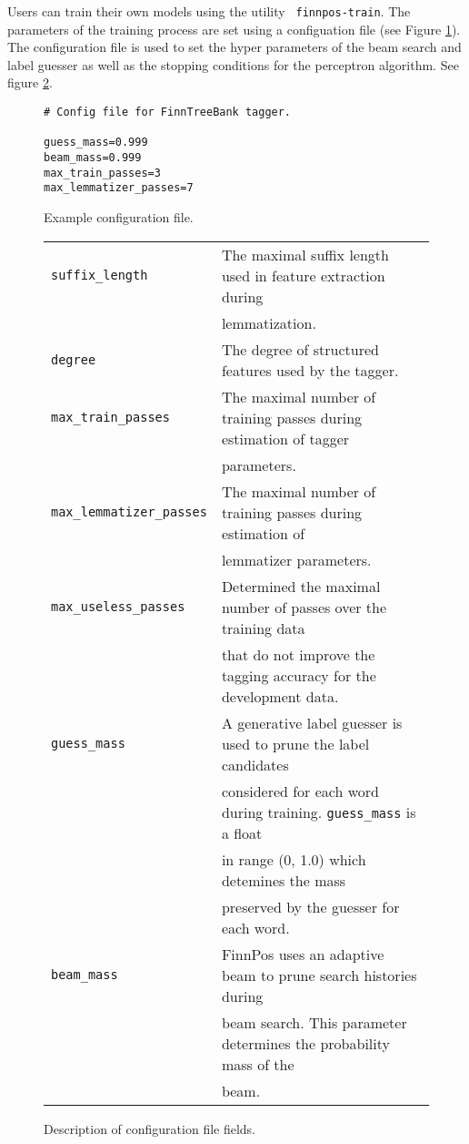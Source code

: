 \documentclass{llncs}
\begin{document}
Users can train their own models using the utility {\tt
  finnpos-train}. The parameters of the training process are set using
a configuation file (see Figure \ref{fig:config-file}). The
configuration file is used to set the hyper parameters of the beam
search and label guesser as well as the stopping conditions for the
perceptron algorithm. See figure \ref{fig:config-fields}.

\begin{figure}
\begin{framed}
\begin{verbatim}
# Config file for FinnTreeBank tagger.

guess_mass=0.999
beam_mass=0.999
max_train_passes=3
max_lemmatizer_passes=7
\end{verbatim}
\end{framed}
\caption{Example configuration file.}\label{fig:config-file}
\end{figure}

\begin{figure}
\begin{tabular}{ll}
{\tt suffix\_length} & The maximal suffix length used in feature extraction during\\
                     & lemmatization.\\
{\tt degree} & The degree of structured features used by the tagger. \\
{\tt max\_train\_passes} & The maximal number of training passes during estimation of tagger\\
                         & parameters.\\
{\tt max\_lemmatizer\_passes} & The maximal number of training passes during estimation of\\
                              & lemmatizer parameters.\\
{\tt max\_useless\_passes} & Determined the maximal number of passes over the training data\\
                           & that do not improve the tagging accuracy for the development data.\\
{\tt guess\_mass} & A generative label guesser is used to prune the label candidates\\
                  & considered for each word during training. {\tt guess\_mass} is a float\\
                  & in range (0, 1.0) which detemines the mass \\
                  &  preserved by the guesser for each word.\\
{\tt beam\_mass} & FinnPos uses an adaptive beam to prune search histories during\\
                 & beam search. This parameter determines the probability mass of the\\
                 & beam.
\end{tabular}
\caption{Description of configuration file fields.}\label{fig:config-fields}
\end{figure}
\end{document}
